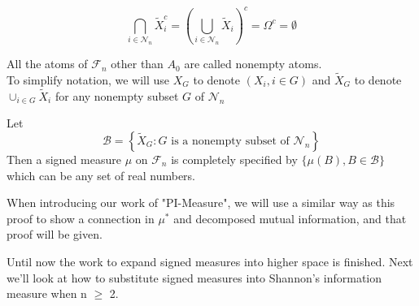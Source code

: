 \begin{equation}
    \bigcap_{i \in \mathcal{N}_{n}} \tilde{X}_{i}^{c}=\left(\bigcup_{i \in \mathcal{N}_{n}} \tilde{X}_{i}\right)^{c}=\Omega^{c}=\emptyset
\end{equation}


All the atoms of $\mathcal{F}_{n}$ other than $A_{0}$ are called nonempty atoms.\\
 
 To simplify notation, we will use $X_{G}$ to denote $\left(X_{i}, i \in G\right)$ and $\tilde{X}_{G}$ to denote $\cup_{i \in G} \tilde{X}_{i}$ for any nonempty subset $G$ of $\mathcal{N}_{n}$\\
 

\begin{theorem}\label{th1}
Let
\begin{equation}
    \mathcal{B}=\left\{\tilde{X}_{G}: G \text { is a nonempty subset of } \mathcal{N}_{n}\right\}
\end{equation}
Then a signed measure $\mu$ on $\mathcal{F}_{n}$ is completely specified by $\{\mu(B), B \in \mathcal{B}\}$
which can be any set of real numbers.
\end{theorem}
When introducing our work of "PI-Measure", we will use a similar way as this proof to show a connection in $\mu^{*}$ and decomposed mutual information, and that proof will be given.


Until now the work to expand signed measures into higher space is finished. Next we'll look at how to substitute signed measures into Shannon's information measure when n $\geq$ 2.\\

